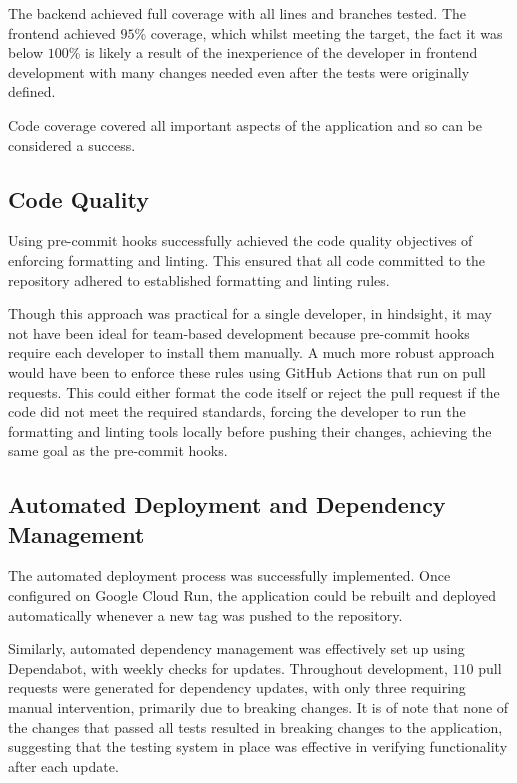 The backend achieved full coverage with all lines and branches tested. The frontend achieved $95\%$ coverage, which whilst meeting the target, the fact it was below $100\%$ is likely a result of the inexperience of the developer in frontend development with many changes needed even after the tests were originally defined.

Code coverage covered all important aspects of the application and so can be considered a success.
\ifshowappendix
\fi

\subsection{Code Quality}
Using pre-commit hooks successfully achieved the code quality objectives of enforcing formatting and linting. This ensured that all code committed to the repository adhered to established formatting and linting rules.

Though this approach was practical for a single developer, in hindsight, it may not have been ideal for team-based development because pre-commit hooks require each developer to install them manually. A much more robust approach would have been to enforce these rules using GitHub Actions that run on pull requests. This could either format the code itself or reject the pull request if the code did not meet the required standards, forcing the developer to run the formatting and linting tools locally before pushing their changes, achieving the same goal as the pre-commit hooks.

\subsection{Automated Deployment and Dependency Management}
The automated deployment process was successfully implemented. Once configured on Google Cloud Run, the application could be rebuilt and deployed automatically whenever a new tag was pushed to the repository.

Similarly, automated dependency management was effectively set up using Dependabot, with weekly checks for updates. Throughout development, $110$ pull requests were generated for dependency updates, with only three requiring manual intervention, primarily due to breaking changes. It is of note that none of the changes that passed all tests resulted in breaking changes to the application, suggesting that the testing system in place was effective in verifying functionality after each update.
